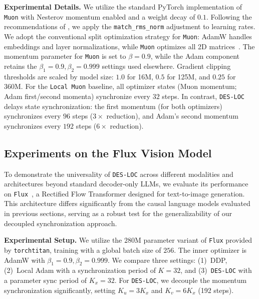 \textbf{Experimental Details.} We utilize the standard PyTorch implementation of \texttt{Muon} with Nesterov momentum enabled and a weight decay of $0.1$. Following the recommendations of \citet{liu2025muon}, we apply the \texttt{match\_rms\_norm} adjustment to learning rates. We adopt the conventional split optimization strategy for \texttt{Muon}: AdamW handles embeddings and layer normalizations, while \texttt{Muon} optimizes all 2D matrices~\citep{jordan2024muon}. The momentum parameter for \texttt{Muon} is set to $\beta=0.9$, while the Adam component retains the $\beta_1=0.9, \beta_2=0.999$ settings used elsewhere. Gradient clipping thresholds are scaled by model size: $1.0$ for 16M, $0.5$ for 125M, and $0.25$ for 360M. For the \texttt{Local Muon} baseline, all optimizer states (Muon momentum; Adam first/second momenta) synchronize every $32$ steps. In contrast, \texttt{DES-LOC} delays state synchronization: the first momentum (for both optimizers) synchronizes every $96$ steps ($3\times$ reduction), and Adam's second momentum synchronizes every $192$ steps ($6\times$ reduction).

\subsection{Experiments on the Flux Vision Model}
\label{sec:b8_flux}

To demonstrate the universality of \texttt{DES-LOC} across different modalities and architectures beyond standard decoder-only LLMs, we evaluate its performance on \texttt{Flux}~\citep{labs2025flux}, a Rectified Flow Transformer designed for text-to-image generation. This architecture differs significantly from the causal language models evaluated in previous sections, serving as a robust test for the generalizability of our decoupled synchronization approach.

\textbf{Experimental Setup.} We utilize the $280$M parameter variant of \texttt{Flux} provided by \texttt{torchtitan}, training with a global batch size of $256$. The inner optimizer is AdamW with $\beta_1=0.9, \beta_2=0.999$. We compare three settings: (1)~DDP, (2)~Local Adam with a synchronization period of $K=32$, and (3)~\texttt{DES-LOC} with a parameter sync period of $K_x=32$. For \texttt{DES-LOC}, we decouple the momentum synchronization significantly, setting $K_u=3K_x$ and $K_v=6K_x$ (192 steps).

